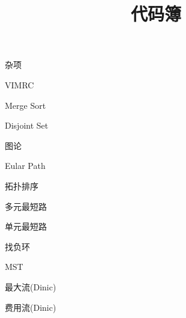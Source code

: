 \documentclass{article}
\title{代码簿}
\begin{document}
\maketitle

\begin{enumerate}

{\bf \LARGE \item  杂项}

	\begin{itemize}

	{\bf \item  VIMRC}
	

	{\bf \item  Merge Sort}
	

	{\bf \item  Disjoint Set}
	

	\end{itemize}

{\bf \LARGE \item  图论}


	\begin{itemize}
	
	{\bf \item  Eular Path}	
	
	
	{\bf \item  拓扑排序}	
		
	
	{\bf \item  多元最短路}
		
	
	{\bf \item  单元最短路}
	
	
	{\bf \item  找负环}
	
	
	{\bf \item MST}
	
	
	{\bf \item 最大流(Dinic)}
	
	
	{\bf \item 费用流(Dinic)}
	
	
	\end{itemize}
	

\end{enumerate}
\end{document}
